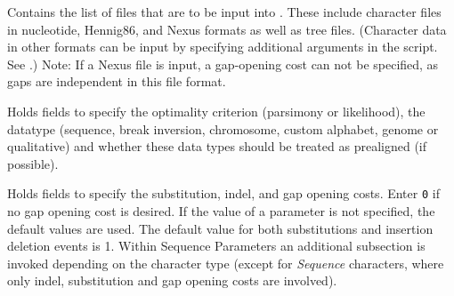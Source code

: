\begin{description}
\setlength{\labelsep}{5pt}
\setlength{\itemindent}{0pt}%
    \item[Input Files]
        Contains the list of files that are to be input into \poy. These include
        character files in nucleotide, Hennig86, and Nexus formats as well as tree files. 
        (Character data in other formats can be input by specifying additional arguments in the script. 
        See .) Note: If a Nexus file is input, a gap-opening cost can not be specified, 
        as gaps are independent in this file format.
    \item[Input Parameters]
    	Holds fields to specify the optimality criterion (parsimony or likelihood), the datatype 
	(sequence, break inversion, chromosome, custom alphabet, genome or qualitative) 
	and whether these data types should be treated as prealigned (if possible).  
    \item[Sequence Parameters]
        Holds fields to specify the substitution, indel, and gap opening costs. Enter \texttt{0} if no
        gap opening cost is desired. If the value of a parameter is not specified, the default values 
        are used. The default value for both substitutions and insertion deletion events is 1. 
        Within Sequence Parameters an additional subsection is invoked depending on the 
        character type (except for \emph{Sequence} characters, where only indel, substitution 
        and gap opening costs are involved).
\end{description}   
     
